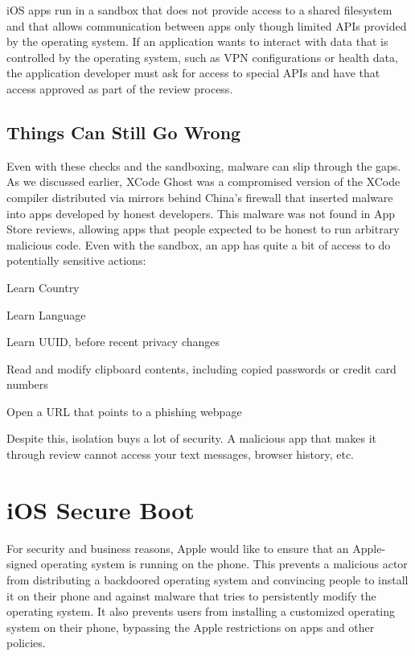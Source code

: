 iOS apps run in a sandbox that does not provide access to a shared filesystem and that allows communication between apps only though limited APIs provided by the operating system. If an application wants to interact with data that is controlled by the operating system, such as VPN configurations or health data, the application developer must ask for access to special APIs and have that access approved as part of the review process.

\subsection{Things Can Still Go Wrong}
Even with these checks and the sandboxing, malware can slip through the gaps. As we discussed earlier, XCode Ghost was a compromised version of the XCode compiler distributed via mirrors behind China's firewall that inserted malware into apps developed by honest developers. This malware was not found in App Store reviews, allowing apps that people expected to be honest to run arbitrary malicious code. Even with the sandbox, an app has quite a bit of access to do potentially sensitive actions:

\begin{compactitem}
	\item Learn Country
	\item Learn Language
	\item Learn UUID, before recent privacy changes
	\item Read and modify clipboard contents, including copied passwords or credit card numbers
	\item Open a URL that points to a phishing webpage 
\end{compactitem}

Despite this, isolation buys a lot of security. A malicious app that makes it through review cannot access your text messages, browser history, etc.

\section{iOS Secure Boot}
For security and business reasons, Apple would like to ensure that an Apple-signed operating system is running on the phone. This prevents a malicious actor from distributing a backdoored operating system and convincing people to install it on their phone and against malware that tries to persistently modify the operating system. It also prevents users from installing a customized operating system on their phone, bypassing the Apple restrictions on apps and other policies.

